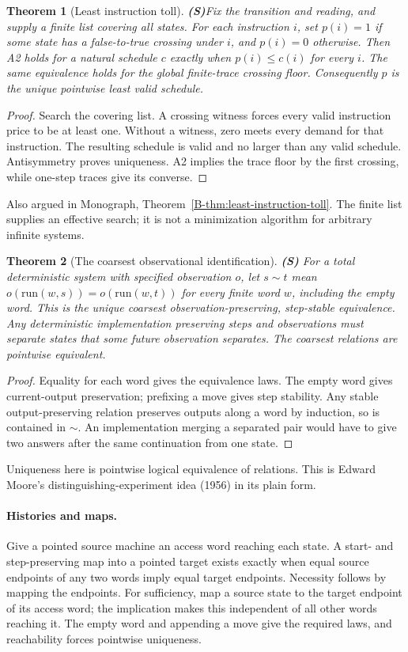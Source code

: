\documentclass[11pt, a4paper]{report}
\theoremstyle{definition}
\theoremstyle{plain}
\newtheorem{theorem}{Theorem}[chapter]
\begin{document}
\begin{theorem}[Least instruction toll] \textbf{(S)}\label{thm:least-toll}
Fix the transition and reading, and supply a finite list covering all states.
For each instruction $i$, set $p(i)=1$ if some state has a false-to-true
crossing under $i$, and $p(i)=0$ otherwise. Then A2 holds for a natural
schedule $c$ exactly when $p(i)\le c(i)$ for every $i$. The same equivalence
holds for the global finite-trace crossing floor. Consequently $p$ is the
unique pointwise least valid schedule.
\end{theorem}
\begin{proof}
Search the covering list. A crossing witness forces every valid instruction
price to be at least one. Without a witness, zero meets every demand for
that instruction. The resulting schedule is valid and no larger than any
valid schedule. Antisymmetry proves uniqueness. A2 implies the trace floor
by the first crossing, while one-step traces give its converse.
\end{proof}
\noindent Also argued in Monograph, Theorem~\ref{B-thm:least-instruction-toll}. The finite list supplies an effective
search; it is not a minimization algorithm for arbitrary infinite systems.

\begin{theorem}[The coarsest observational identification] \textbf{(S)}
For a total deterministic system with specified observation $o$, let $s\sim t$
mean $o(\mathrm{run}(w,s))=o(\mathrm{run}(w,t))$ for every finite word $w$,
including the empty word. This is the unique coarsest observation-preserving,
step-stable equivalence. Any deterministic implementation preserving steps
and observations must separate states that some future observation separates.
The coarsest relations are pointwise equivalent.
\end{theorem}
\begin{proof}
Equality for each word gives the equivalence laws. The empty word gives
current-output preservation; prefixing a move gives step stability. Any
stable output-preserving relation preserves outputs along a word by
induction, so is contained in $\sim$. An implementation merging a separated
pair would have to give two answers after the same continuation from one state.
\end{proof}
Uniqueness here is pointwise logical equivalence of relations. This is Edward
Moore's distinguishing-experiment idea (1956) in its plain form.


\paragraph{Histories and maps.}
Give a pointed source machine an access word reaching each
state. A start- and step-preserving map into a pointed target exists exactly
when equal source endpoints of any two words imply equal target endpoints.
Necessity follows by mapping the endpoints. For sufficiency, map a source
state to the target endpoint of its access word; the implication makes this
independent of all other words reaching it. The empty word and appending a
move give the required laws, and reachability forces pointwise uniqueness.
\end{document}
